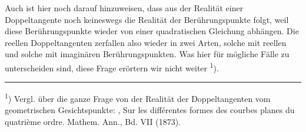 
Auch ist hier noch darauf hinzuweisen, dass aus der Realit\"at
einer Doppeltangente noch keineswegs die Realit\"at der Ber\"uhrungspunkte
 folgt, weil diese Ber\"uhrungspunkte wieder von einer
quadratischen Gleichung abh\"angen. Die reellen Doppeltangenten
zerfallen also wieder in zwei Arten, solche mit reellen und
solche mit imagin\"aren Ber\"uhrungspunkten. Was hier f\"ur m\"ogliche
 F\"alle zu unterscheiden sind, diese Frage er\"ortern wir nicht
weiter \textsuperscript{1}).

\begin{center}
\rule{0.3\linewidth}{0.4pt}
\end{center}

\textsuperscript{1}) Vergl. \"uber die ganze Frage von der Realit\"at der Doppeltangenten
vom geometrischen Gesichtspunkte: , \glqq Sur les diff\'erentes formes
des courbes planes du quatri\`eme ordre\grqq{}. Mathem. Ann., Bd. VII (1873).
